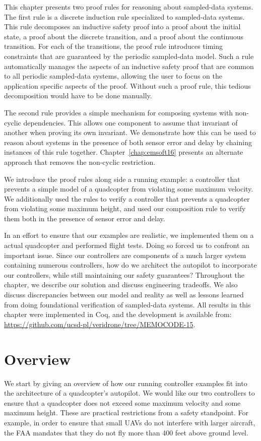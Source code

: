 This chapter presents two proof rules for reasoning about sampled-data
systems. The first rule is a discrete induction rule specialized to
sampled-data systems. This rule decomposes an inductive safety proof into a
proof about the initial state, a proof about the discrete transition, and a
proof about the continuous transition. For each of the transitions, the
proof rule introduces timing constraints that are guaranteed by the
periodic sampled-data model. Such a rule automatically manages the aspects
of an inductive safety proof that are common to all periodic sampled-data
systems, allowing the user to focus on the application specific aspects of
the proof. Without such a proof rule, this tedious decomposition would have
to be done manually.

The second rule provides a simple mechanism for composing systems with
non-cyclic dependencies. This allows one component to assume that invariant
of another when proving its own invariant. We demonstrate how this can be
used to reason about systems in the presence of both sensor error and delay
by chaining instances of this rule together. Chapter~\ref{chap:emsoft16}
presents an alternate approach that removes the non-cyclic restriction.

We introduce the proof rules along side a running example: a controller
that prevents a simple model of a quadcopter from violating some maximum
velocity. We additionally used the rules to verify a controller that
prevents a quadcopter from violating some maximum height, and used our
composition rule to verify them both in the presence of sensor error and
delay.

In an effort to ensure that our examples are realistic, we implemented them
on a actual quadcopter and performed flight tests. Doing so forced us to
confront an important issue. Since our controllers are components of a much
larger system containing numerous controllers, how do we architect the
autopilot to incorporate our controllers, while still maintaining our
safety guarantees? Throughout the chapter, we describe our solution and
discuss engineering tradeoffs. We also discuss discrepancies between our
model and reality as well as lessons learned from doing foundational
verification of sampled-data systems. All results in this chapter were
implemented in Coq, and the development is available
from: \url{https://github.com/ucsd-pl/veridrone/tree/MEMOCODE-15}.

\section{Overview}
\label{sec:memo-overview}
We start by giving an overview of how our running controller examples fit
into the architecture of a quadcopter's autopilot. We would like our two
controllers to ensure that a quadcopter does not exceed some maximum
velocity and some maximum height. These are practical restrictions from a
safety standpoint. For example, in order to ensure that small UAVs do not
interfere with larger aircraft, the FAA mandates that they do not fly more
than 400 feet above ground level.

